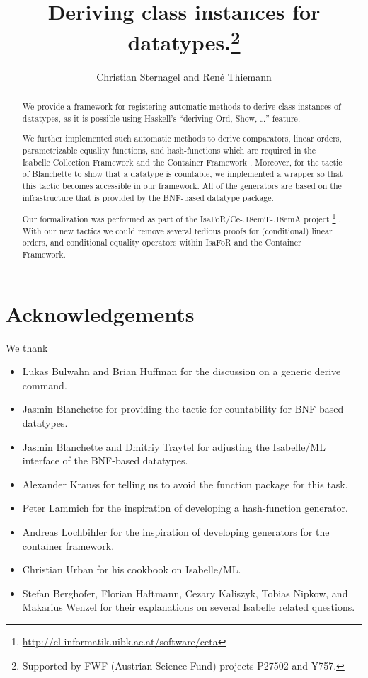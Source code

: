 \documentclass[11pt,a4paper]{article}
\newcommand\isafor{\textsf{IsaFoR}}
\newcommand\ceta{\textsf{Ce\kern-.18emT\kern-.18emA}}
\begin{document}
\title{Deriving class instances for datatypes.\footnote{Supported by FWF (Austrian Science Fund) projects P27502 and Y757.}}
\author{Christian Sternagel and Ren\'e Thiemann}
\maketitle

\begin{abstract}
  We provide a framework for registering automatic methods 
  to derive class instances 
  of datatypes, 
  as it is possible using Haskell's ``deriving Ord, Show, \ldots'' feature.
  
  We further implemented such automatic methods to derive comparators, linear orders, parametrizable equality functions,
  and hash-functions which are required in the 
  Isabelle Collection Framework \cite{rbt} and the Container Framework \cite{containers}. 
  Moreover, for the tactic of Blanchette to show that a datatype is countable, we implemented a 
  wrapper so that this tactic becomes accessible in our framework. All of the generators are based on 
  the infrastructure that is provided by the BNF-based datatype package.
  
  Our formalization was performed as part of the \isafor/\ceta{} project%
  \footnote{\url{http://cl-informatik.uibk.ac.at/software/ceta}} \cite{CeTA}.
  With our new tactics we could remove 
  several tedious proofs for (conditional) linear orders, and conditional equality operators
  within \isafor{} and the Container Framework.
\end{abstract}

\tableofcontents




\section{Acknowledgements}
We thank 
\begin{itemize}
\item Lukas Bulwahn and Brian Huffman for the discussion on a generic derive command.
\item Jasmin Blanchette for providing the tactic for countability for BNF-based datatypes.
\item Jasmin Blanchette and Dmitriy Traytel for adjusting the Isabelle/ML interface of
  the BNF-based datatypes.
\item Alexander Krauss for telling us to avoid the function package for this task.
\item Peter Lammich for the inspiration of developing a hash-function generator.
\item Andreas Lochbihler for the inspiration of developing generators for the container framework.
\item Christian Urban for his cookbook on Isabelle/ML.
\item Stefan Berghofer, Florian Haftmann, Cezary Kaliszyk, Tobias Nipkow, and Makarius Wenzel for their explanations
  on several Isabelle related questions.
\end{itemize}



\end{document}
